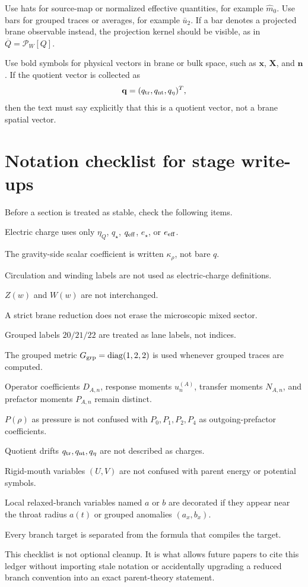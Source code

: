 Use hats for source-map or normalized effective quantities, for example \(\hat m_0\).  Use bars for grouped traces or averages, for example \(\bar u_2\).  If a bar denotes a projected brane observable instead, the projection kernel should be visible, as in \(\overline Q=\mathcal P_W[Q]\).

Use bold symbols for physical vectors in brane or bulk space, such as \(\mathbf x\), \(\mathbf X\), and \(\mathbf n\).  If the quotient vector is collected as
\[
  \mathbf q=(q_{\rm tr},q_{\rm nt},q_\eta)^T,
\]
then the text must say explicitly that this is a quotient vector, not a brane spatial vector.

\section{Notation checklist for stage write-ups}
\label{sec:notation-stage-checklist}

Before a section is treated as stable, check the following items.

\begin{verificationchecklist}
  \item Electric charge uses only \(\eta_Q\), \(q_\star\), \(q_{\rm eff}\), \(e_\star\), or \(e_{\rm eff}\).
  \item The gravity-side scalar coefficient is written \(\kappa_\rho\), not bare \(q\).
  \item Circulation and winding labels are not used as electric-charge definitions.
  \item \(Z(w)\) and \(W(w)\) are not interchanged.
  \item A strict brane reduction does not erase the microscopic mixed sector.
  \item Grouped labels \(20/21/22\) are treated as lane labels, not indices.
  \item The grouped metric \(G_{\rm grp}=\operatorname{diag}(1,2,2)\) is used whenever grouped traces are computed.
  \item Operator coefficients \(D_{A,n}\), response moments \(u_n^{(A)}\), transfer moments \(N_{A,n}\), and prefactor moments \(P_{A,n}\) remain distinct.
  \item \(P(\rho)\) as pressure is not confused with \(P_0,P_1,P_2,P_4\) as outgoing-prefactor coefficients.
  \item Quotient drifts \(q_{\rm tr},q_{\rm nt},q_\eta\) are not described as charges.
  \item Rigid-mouth variables \((U,V)\) are not confused with parent energy or potential symbols.
  \item Local relaxed-branch variables named \(a\) or \(b\) are decorated if they appear near the throat radius \(a(t)\) or grouped anomalies \((a_x,b_x)\).
  \item Every branch target is separated from the formula that compiles the target.
\end{verificationchecklist}

This checklist is not optional cleanup.  It is what allows future papers to cite this ledger without importing stale notation or accidentally upgrading a reduced branch convention into an exact parent-theory statement.
